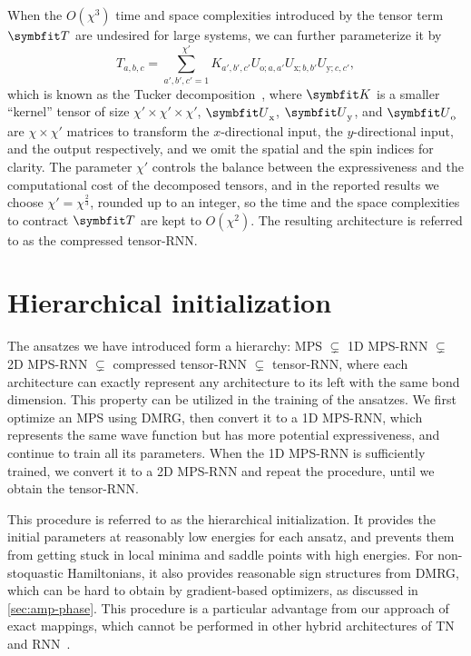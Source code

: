 When the $O(\chi^3)$ time and space complexities introduced by the tensor term $\mT$ are undesired for large systems, we can further parameterize it by
\begin{equation}
T_{a, b, c} = \sum_{a', b', c' = 1}^{\chi'} K_{a', b', c'} U_{\text{o}; a, a'}  U_{\text{x}; b, b'} U_{\text{y}; c, c'},
\label{eq:tensor-decomp}
\end{equation}
which is known as the Tucker decomposition~\cite{tucker1966some}, where $\mK$ is a smaller ``kernel'' tensor of size $\chi' \times \chi' \times \chi'$, $\mU_\text{x}$, $\mU_\text{y}$, and $\mU_\text{o}$ are $\chi \times \chi'$ matrices to transform the $x$-directional input, the $y$-directional input, and the output respectively, and we omit the spatial and the spin indices for clarity. The parameter $\chi'$ controls the balance between the expressiveness and the computational cost of the decomposed tensors, and in the reported results we choose $\chi' = \chi^\frac{2}{3}$, rounded up to an integer, so the time and the space complexities to contract $\mT$ are kept to $O(\chi^2)$. The resulting architecture is referred to as the compressed tensor-RNN.

\section{Hierarchical initialization}

The ansatzes we have introduced form a hierarchy: MPS $\subsetneq$ 1D MPS-RNN $\subsetneq$ 2D MPS-RNN $\subsetneq$ compressed tensor-RNN $\subsetneq$ tensor-RNN, where each architecture can exactly represent any architecture to its left with the same bond dimension. This property can be utilized in the training of the ansatzes. We first optimize an MPS using DMRG, then convert it to a 1D MPS-RNN, which represents the same wave function but has more potential expressiveness, and continue to train all its parameters. When the 1D MPS-RNN is sufficiently trained, we convert it to a 2D MPS-RNN and repeat the procedure, until we obtain the tensor-RNN.

This procedure is referred to as the hierarchical initialization. It provides the initial parameters at reasonably low energies for each ansatz, and prevents them from getting stuck in local minima and saddle points with high energies. For non-stoquastic Hamiltonians, it also provides reasonable sign structures from DMRG, which can be hard to obtain by gradient-based optimizers, as discussed in \cref{sec:amp-phase}. This procedure is a particular advantage from our approach of exact mappings, which cannot be performed in other hybrid architectures of TN and RNN~\cite{hibat2021variational, hibat2022supplementing, chen2023antn}.

